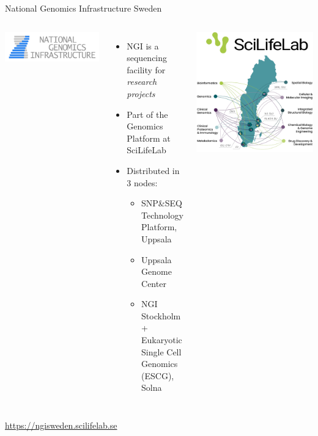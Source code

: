 \documentclass[10pt]{beamer}
\newcommand{\credit}[1]{{\vspace{\fill} \par \raggedleft \scriptsize \mdseries \color{mDarkBrown} #1 \par}}
\begin{document}
\begin{frame}{National Genomics Infrastructure Sweden}
  \begin{columns}[T]
	\begin{center}
		\hspace*{-1cm}
		\includegraphics[height=0.2\textheight]{./additional_graphics/NGI-logo.png}
	\end{center}
	\begin{itemize}
		\item NGI is a sequencing facility for \emph{research projects} 
		\item Part of the Genomics Platform at SciLifeLab
		\item Distributed in 3 nodes:
		\begin{itemize}
			\item SNP\&SEQ Technology Platform, Uppsala
			\item Uppsala Genome Center
			\item NGI Stockholm + Eukaryotic Single Cell Genomics (ESCG), Solna 
		\end{itemize}
	\end{itemize}
       \includegraphics[width=\textwidth]{./figures/scilifelab-map.png} 
    \end{columns}
	\credit{\href{https://ngisweden.scilifelab.se}{https://ngisweden.scilifelab.se}}
\end{frame}
\end{document}

